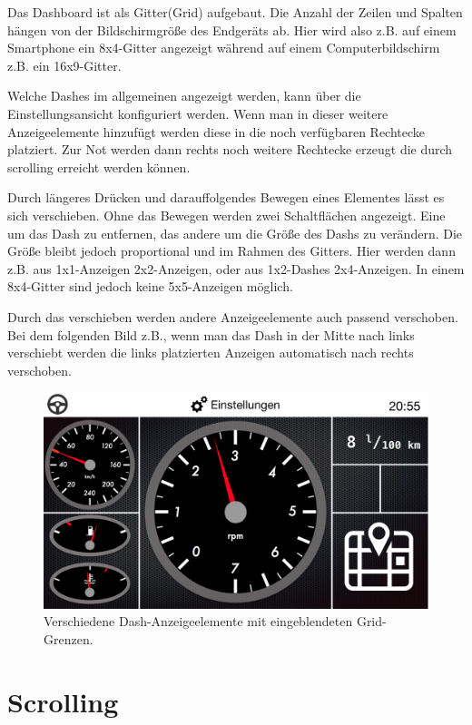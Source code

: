 \documentclass[pflichtenheft.tex]{subfiles}
\begin{document}
Das Dashboard ist als Gitter(Grid) aufgebaut. Die Anzahl der Zeilen und Spalten hängen von der Bildschirmgröße des Endgeräts ab. Hier wird also z.B. auf einem Smartphone ein 8x4-Gitter angezeigt während auf einem Computerbildschirm z.B. ein 16x9-Gitter.

Welche Dashes im allgemeinen angezeigt werden, kann über die Einstellungsansicht konfiguriert werden. Wenn man in dieser weitere Anzeigeelemente hinzufügt werden diese in die noch verfügbaren Rechtecke platziert. Zur Not werden dann rechts noch weitere Rechtecke erzeugt die durch scrolling erreicht werden können.

Durch längeres Drücken und darauffolgendes Bewegen eines Elementes lässt es sich verschieben. Ohne das Bewegen werden zwei Schaltflächen angezeigt. Eine um das Dash zu entfernen, das andere um die Größe des Dashs zu verändern. Die Größe bleibt jedoch proportional und im Rahmen des Gitters. Hier werden dann z.B. aus 1x1-Anzeigen 2x2-Anzeigen, oder aus 1x2-Dashes 2x4-Anzeigen. In einem 8x4-Gitter sind jedoch keine 5x5-Anzeigen möglich.

Durch das verschieben werden andere Anzeigeelemente auch passend verschoben. Bei dem folgenden Bild z.B., wenn man das Dash in der Mitte nach links verschiebt werden die links platzierten Anzeigen automatisch nach rechts verschoben.

\begin{figure}[H]
  	\begin{center}
 		\includegraphics[width=\textwidth]{Images/GUI-DashboardGrid2.png}
  		\caption{Verschiedene Dash-Anzeigeelemente mit eingeblendeten Grid-Grenzen.}
  	\end{center}
\end{figure}

\clearpage
\section{Scrolling}
\end{document}
